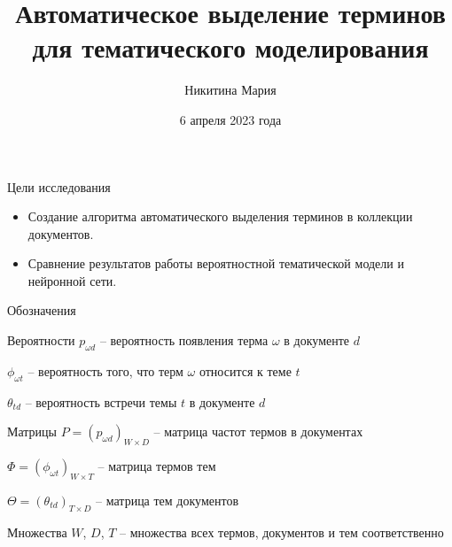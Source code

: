 \documentclass{beamer}
\begin{document}
\title{Автоматическое выделение терминов для тематического моделирования}  
\author{Никитина Мария}
\date{6 апреля 2023 года} 
\frame{\titlepage} 

\begin{frame}{Цели исследования}
\begin{itemize}
    \item Создание алгоритма автоматического выделения терминов в коллекции документов.
    \item Сравнение результатов работы вероятностной тематической модели и нейронной сети.
\end{itemize}
\end{frame}

\begin{frame}{Обозначения}
\begin{block}{Вероятности}
$p_{\omega d}$ -- вероятность появления терма $\omega$ в документе $d$

$\phi_{\omega t}$ -- вероятность того, что терм $\omega$ относится к теме $t$

$\theta_{td}$ -- вероятность встречи темы $t$ в документе $d$
\end{block}

\begin{block}{Матрицы}
$P = (p_{\omega d})_{W \times D}$ -- матрица частот термов в документах

$\Phi = (\phi_{\omega t})_{W \times T}$ -- матрица термов тем

$\Theta = (\theta_{td})_{T \times D}$ -- матрица тем документов
\end{block}

\begin{block}{Множества}
$W$, $D$, $T$ -- множества всех термов, документов и тем соответственно
\end{block}
\end{frame}
\end{document}
